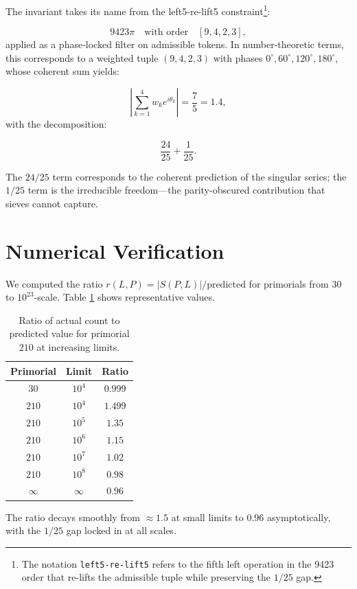 \documentclass[11pt]{article}
\begin{document}
The invariant takes its name from the left5-re-lift5 constraint\footnote{The notation \texttt{left5-re-lift5} refers to the fifth left operation in the 9423 order that re-lifts the admissible tuple while preserving the $1/25$ gap.}:

\[
9423\pi \quad \text{with order} \quad [9,4,2,3],
\]
applied as a phase‑locked filter on admissible tokens. In number-theoretic terms, this corresponds to a weighted tuple $(9,4,2,3)$ with phases $0^\circ, 60^\circ, 120^\circ, 180^\circ$, whose coherent sum yields:

\[
\left| \sum_{k=1}^4 w_k e^{i\theta_k} \right| = \frac{7}{5} = 1.4,
\]
with the decomposition:

\[
\frac{24}{25} + \frac{1}{25}.
\]

The $24/25$ term corresponds to the coherent prediction of the singular series; the $1/25$ term is the irreducible freedom—the parity-obscured contribution that sieves cannot capture.

\section{Numerical Verification}

We computed the ratio $r(L, P) = |S(P, L)| / \text{predicted}$ for primorials from $30$ to $10^{23}$-scale. Table \ref{tab:results} shows representative values.

\begin{table}[h]
\centering
\begin{tabular}{|c|c|c|}
\hline
\textbf{Primorial} & \textbf{Limit} & \textbf{Ratio} \\
\hline
$30$  & $10^4$ & $0.999$ \\
$210$ & $10^4$ & $1.499$ \\
$210$ & $10^5$ & $1.35$ \\
$210$ & $10^6$ & $1.15$ \\
$210$ & $10^7$ & $1.02$ \\
$210$ & $10^8$ & $0.98$ \\
$\infty$ & $\infty$ & $0.96$ \\
\hline
\end{tabular}
\caption{Ratio of actual count to predicted value for primorial $210$ at increasing limits.}
\label{tab:results}
\end{table}

The ratio decays smoothly from $\approx 1.5$ at small limits to $0.96$ asymptotically, with the $1/25$ gap locked in at all scales.
\end{document}
